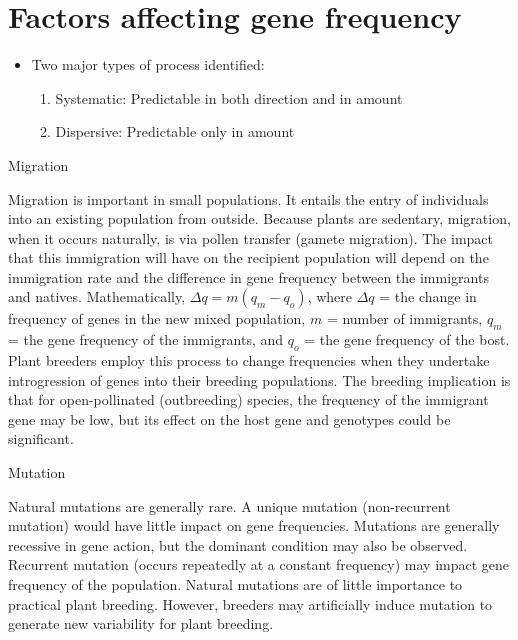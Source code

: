 \documentclass[11pt,dvipsnames,ignorenonframetext,aspectratio=169]{beamer}
\providecommand{\tightlist}{%
  \setlength{\itemsep}{0pt}\setlength{\parskip}{0pt}}
\begin{document}
\hypertarget{factors-affecting-gene-frequency}{%
\section{Factors affecting gene
frequency}\label{factors-affecting-gene-frequency}}

\begin{frame}{}
\protect\hypertarget{section-9}{}

\begin{itemize}
\tightlist
\item
  Two major types of process identified:

  \begin{enumerate}
  \tightlist
  \item
    Systematic: Predictable in both direction and in amount
  \item
    Dispersive: Predictable only in amount
  \end{enumerate}
\end{itemize}

\end{frame}

\begin{frame}{Migration}
\protect\hypertarget{migration}{}

Migration is important in small populations. It entails the entry of
individuals into an existing population from outside. Because plants are
sedentary, migration, when it occurs naturally, is via pollen transfer
(gamete migration). The impact that this immigration will have on the
recipient population will depend on the immigration rate and the
difference in gene frequency between the immigrants and natives.
Mathematically, \(\Delta q = m(q_m - q_o)\), where \(\Delta q\) = the
change in frequency of genes in the new mixed population, \(m\) = number
of immigrants, \(q_m\) = the gene frequency of the immigrants, and
\(q_o\) = the gene frequency of the bost. Plant breeders employ this
process to change frequencies when they undertake introgression of genes
into their breeding populations. The breeding implication is that for
open-pollinated (outbreeding) species, the frequency of the immigrant
gene may be low, but its effect on the host gene and genotypes could be
significant.

\end{frame}

\begin{frame}{Mutation}
\protect\hypertarget{mutation}{}

Natural mutations are generally rare. A unique mutation (non-recurrent
mutation) would have little impact on gene frequencies. Mutations are
generally recessive in gene action, but the dominant condition may also
be observed. Recurrent mutation (occurs repeatedly at a constant
frequency) may impact gene frequency of the population. Natural
mutations are of little importance to practical plant breeding. However,
breeders may artificially induce mutation to generate new variability
for plant breeding.

\end{frame}
\end{document}

